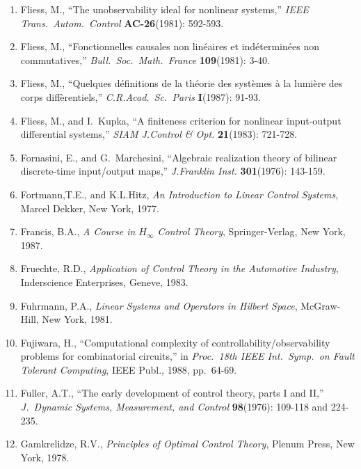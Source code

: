 \begin{enumerate}
\item
Fliess, M., ``The unobservability ideal for nonlinear systems,'' {\it IEEE
Trans.\ Autom.\ Control} {\bf AC-26}(1981): 592-593.

\item
Fliess, M., ``Fonctionnelles causales non lin\'eaires et ind\'etermin\'ees non
commutatives,'' {\it Bull.\ Soc.\ Math.\ France} {\bf 109}(1981): 3-40.

\item
Fliess, M., ``Quelques d\'efinitions de la th\'eorie des syst\`emes
\`a la lumi\`ere des corps diff\`erentiels,'' {\it C.R.Acad.\ Sc.\ Paris}
{\bf I}(1987): 91-93.

\item
Fliess, M., and I.\ Kupka, ``A finiteness criterion for nonlinear input-output
differential systems,'' {\it SIAM J.Control \& Opt.} {\bf 21}(1983): 721-728.

\item
Fornasini, E., and G.\ Marchesini, ``Algebraic realization theory of bilinear
discrete-time input/output maps,'' {\it J.Franklin Inst.} {\bf 301}(1976):
143-159.

\item
Fortmann,T.E., and K.L.Hitz, {\it An Introduction to Linear Control Systems},
Marcel Dekker, New York, 1977.

\item
Francis, B.A., {\it A Course in $H_\infty$ Control Theory}, Springer-Verlag,
New York, 1987.

\item
Fruechte, R.D., {\it Application of Control Theory in the Automotive
Industry}, Inderscience Enterprises, Geneve, 1983.

\item
Fuhrmann, P.A., {\it Linear Systems and Operators in Hilbert Space},
McGraw-Hill, New York, 1981.

\item
Fujiwara, H., ``Computational complexity of controllability/obs\-erv\-ability
problems for combinatorial circuits,'' in {\it Proc.\ 18th IEEE Int.\ Symp.\
on Fault Tolerant Computing}, IEEE Publ., 1988, pp.\ 64-69.

\item
Fuller, A.T., ``The early development of control theory, parts I and II,''
{\it J.\ Dynamic Systems, Measurement, and Control} {\bf 98}(1976): 109-118
and 224-235.

\item
Gamkrelidze, R.V., {\it Principles of Optimal Control Theory}, Plenum Press,
New York, 1978.


\end{enumerate}
